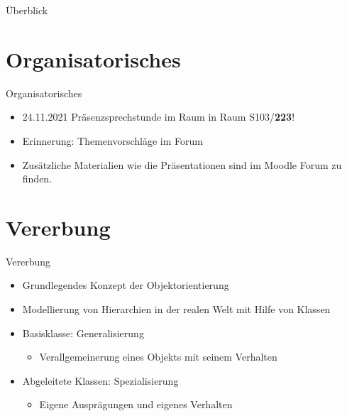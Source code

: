 \documentclass{../tuda-beamer}
\date{17. November 2021}
\begin{document}
    \maketitle

    \begin{frame}{Überblick}
        \tableofcontents
    \end{frame}


    \section{Organisatorisches}
    \begin{frame}{Organisatorisches}
        \begin{itemize}
            \item 24.11.2021 Präsenzsprechstunde im Raum in Raum S103/\textbf{223}!
            \item Erinnerung: Themenvorschläge im Forum
            \item Zusätzliche Materialien wie die Präsentationen sind im Moodle Forum zu finden.
        \end{itemize}
    \end{frame}


    \section{Vererbung}
    \begin{frame}{Vererbung}
        \begin{itemize}
            \item Grundlegendes Konzept der Objektorientierung
            \item Modellierung von Hierarchien in der realen Welt mit Hilfe von Klassen
            \item Basisklasse: Generalisierung
            \begin{itemize}
                \item Verallgemeinerung eines Objekts mit seinem Verhalten
            \end{itemize}
            \item Abgeleitete Klassen: Spezialisierung
            \begin{itemize}
                \item Eigene Ausprägungen und eigenes Verhalten
            \end{itemize}
        \end{itemize}
    \end{frame}
\end{document}

